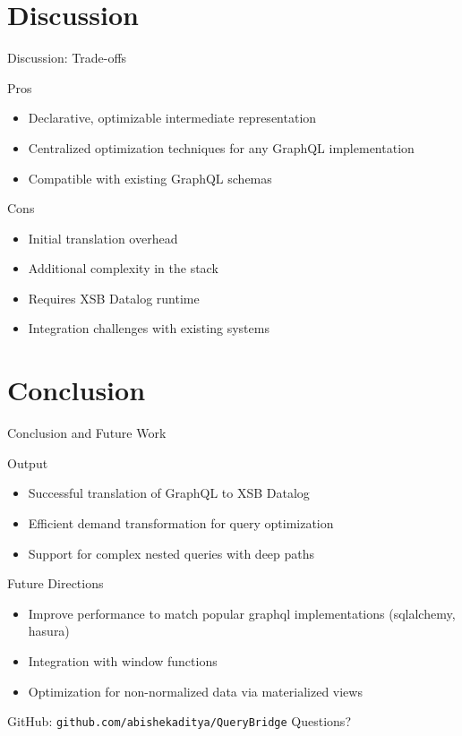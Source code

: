 \documentclass{beamer}
\begin{document}
\section{Discussion}
\begin{frame}{Discussion: Trade-offs}
  \begin{block}{Pros}
    \begin{itemize}
      \item Declarative, optimizable intermediate representation
      \item Centralized optimization techniques for any GraphQL implementation
      \item Compatible with existing GraphQL schemas
    \end{itemize}
  \end{block}
  \begin{block}{Cons}
    \begin{itemize}
      \item Initial translation overhead
      \item Additional complexity in the stack
      \item Requires XSB Datalog runtime
      \item Integration challenges with existing systems
    \end{itemize}
  \end{block}
\end{frame}

\section{Conclusion}
\begin{frame}{Conclusion and Future Work}
  \begin{block}{Output}
    \begin{itemize}
      \item Successful translation of GraphQL to XSB Datalog
      \item Efficient demand transformation for query optimization
      \item Support for complex nested queries with deep paths
    \end{itemize}
  \end{block}
  
  \begin{block}{Future Directions}
    \begin{itemize}
      \item Improve performance to match popular graphql implementations (sqlalchemy, hasura)
      \item Integration with window functions
      \item Optimization for non-normalized data via materialized views
    \end{itemize}
  \end{block}
  
  \vspace{0.3cm}
  \centering GitHub: \texttt{github.com/abishekaditya/QueryBridge}
  \bigskip
  \centering Questions? \smiley
\end{frame}

\end{document}
